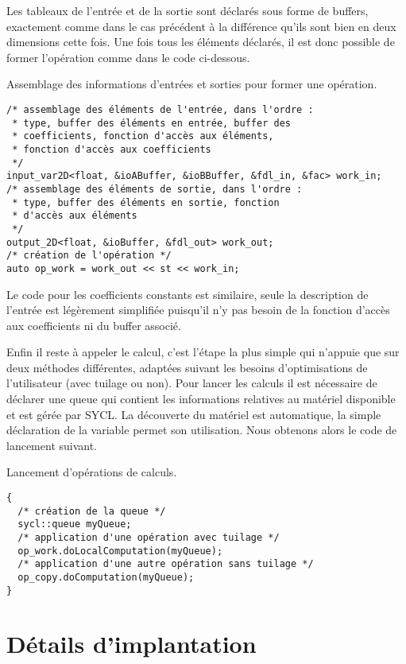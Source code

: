 Les tableaux de l'entrée et de la sortie sont déclarés sous forme de buffers, exactement comme dans le cas précédent à la différence qu'ils sont bien en deux dimensions cette fois. Une fois tous les éléments déclarés, il est donc possible de former l'opération comme dans le code ci-dessous.
\begin{listing}[H]
\label{lst:tab_io}
\caption{Assemblage des informations d'entrées et sorties pour former une opération.}
\begin{verbatim}
/* assemblage des éléments de l'entrée, dans l'ordre :
 * type, buffer des éléments en entrée, buffer des 
 * coefficients, fonction d'accès aux éléments,
 * fonction d'accès aux coefficients
 */
input_var2D<float, &ioABuffer, &ioBBuffer, &fdl_in, &fac> work_in;
/* assemblage des éléments de sortie, dans l'ordre :
 * type, buffer des éléments en sortie, fonction
 * d'accès aux éléments
 */
output_2D<float, &ioBuffer, &fdl_out> work_out;
/* création de l'opération */
auto op_work = work_out << st << work_in;
\end{verbatim}
\end{listing}
Le code pour les coefficients constants est similaire, seule la description de l'entrée est légèrement simplifiée puisqu'il n'y pas besoin de la fonction d'accès aux coefficients ni du buffer associé. 

Enfin il reste à appeler le calcul, c'est l'étape la plus simple qui n'appuie que sur deux méthodes différentes, adaptées suivant les besoins d'optimisations de l'utilisateur (avec tuilage ou non). Pour lancer les calculs il est nécessaire de déclarer une queue qui contient les informations relatives au matériel disponible et est gérée par \textsf{SYCL}. La découverte du matériel est automatique, la simple déclaration de la variable permet son utilisation. Nous obtenons alors le code de lancement suivant.
\begin{listing}[H]
\caption{Lancement d'opérations de calculs.}
\begin{verbatim}
{   
  /* création de la queue */
  sycl::queue myQueue; 
  /* application d'une opération avec tuilage */
  op_work.doLocalComputation(myQueue);
  /* application d'une autre opération sans tuilage */
  op_copy.doComputation(myQueue);
}
\end{verbatim}
\end{listing}

\section{Détails d'implantation}


